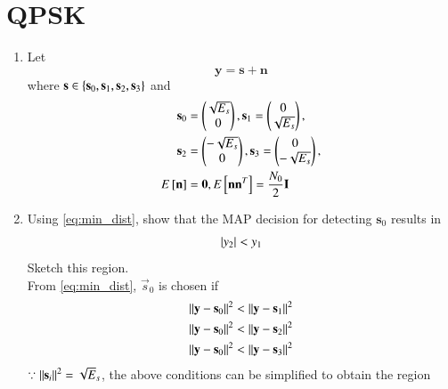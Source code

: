 \documentclass[journal,12pt,twocolumn]{IEEEtran}
\renewcommand\thesection{\arabic{section}}
\begin{document}
\section{QPSK}
\begin{enumerate}[label=\thesection.\arabic*.,ref=\thesection.\theenumi]
%
\item Let
\begin{equation}
\label{eq:qpsk_rx}
\mathbf{y} = \mathbf{s}+ \mathbf{n}
\end{equation}
where $\mathbf{s} \in \left\{\mathbf{s}_0,\mathbf{s}_1,\mathbf{s}_2, \mathbf{s}_3\right\}$ and
\begin{align}
\label{eq:qpsk_s0}
\mathbf{s}_0 &= 
\begin{pmatrix*}
\sqrt{E_s}\\
0
\end{pmatrix*},
\mathbf{s}_1 = 
\begin{pmatrix*}
0\\
\sqrt{E_s}
\end{pmatrix*},
\\
\mathbf{s}_2 &= 
\begin{pmatrix*}
-\sqrt{E_s}\\
0
\end{pmatrix*},
\mathbf{s}_3 = 
\begin{pmatrix*}
0\\
-\sqrt{E_s}
\end{pmatrix*},
\\
E\sbrak{\mathbf{n}} &= \mathbf{0}, E\sbrak{\mathbf{n}\mathbf{n}^T} = \frac{N_0}{2} \mathbf{I}
\label{eq:qpsk_mean}
\end{align}
%
\item Using \eqref{eq:min_dist}, show that the MAP decision for detecting $\mathbf{s}_0$ results in
\begin{equation}
\label{eq:qpsk_dec}
\left\vert y_2\right\vert < y_1
\end{equation}
%
Sketch this region.  
\\
\solution From \eqref{eq:min_dist}, $\vec{s}_0$ is chosen if
\begin{align}
\left\lVert\mathbf{y}-\mathbf{s}_0\right\rVert^2 &<  \left\lVert\mathbf{y}-\mathbf{s}_1\right\rVert^2 
\\
\left\lVert\mathbf{y}-\mathbf{s}_0\right\rVert^2 &<  \left\lVert\mathbf{y}-\mathbf{s}_2\right\rVert^2 
\\
\left\lVert\mathbf{y}-\mathbf{s}_0\right\rVert^2 &<  \left\lVert\mathbf{y}-\mathbf{s}_3\right\rVert^2 
\end{align}
%
$\because \left\lVert\mathbf{s}_i\right\rVert^2 = \sqrt{E}_s$, the above conditions can be simplified to obtain the region

\end{enumerate}
\end{document}
